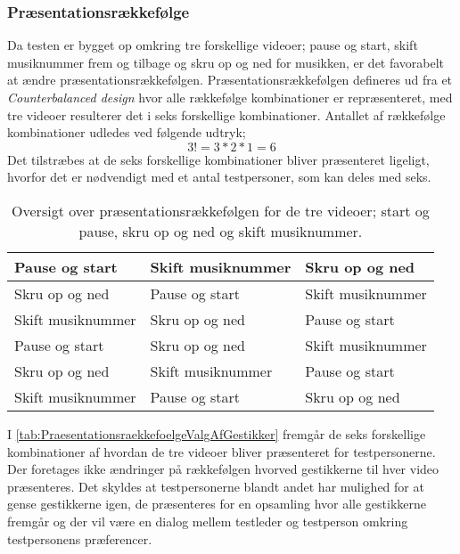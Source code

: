 \subsubsection{Præsentationsrækkefølge}
\label{PraesentationsraekkefoelgeValgAfGestikker}
%
Da testen er bygget op omkring tre forskellige videoer; pause og start, skift musiknummer frem og tilbage og skru op og ned for musikken, er det favorabelt at ændre præsentationsrækkefølgen. Præsentationsrækkefølgen defineres ud fra et \textit{Counterbalanced design} hvor alle rækkefølge kombinationer er repræsenteret, med tre videoer resulterer det i seks forskellige kombinationer. Antallet af rækkefølge kombinationer udledes ved følgende udtryk;
%
\begin{equation}
	3! = 3*2*1 = 6
\end{equation}
%
Det tilstræbes at de seks forskellige kombinationer bliver præsenteret ligeligt, hvorfor det er nødvendigt med et antal testpersoner, som kan deles med seks.
%
\begin{table}[H]
	\centering
	\begin{tabular}{ |  p{4cm}  |  p{4cm}  |  p{4cm}  |}
		\hline
		Pause og start & Skift musiknummer & Skru op og ned \\ \hline
		Skru op og ned & Pause og start & Skift musiknummer\\ \hline
		Skift musiknummer & Skru op og ned & Pause og start \\ \hline
		Pause og start & Skru op og ned & Skift musiknummer\\ \hline
		Skru op og ned & Skift musiknummer & Pause og start\\ \hline
		Skift musiknummer & Pause og start & Skru op og ned \\ \hline
	\end{tabular}
	\caption{Oversigt over præsentationsrækkefølgen for de tre videoer; start og pause, skru op og ned og skift musiknummer.}
	\label{tab:PraesentationsraekkefoelgeValgAfGestikker}
\end{table}
\noindent
%
I \autoref{tab:PraesentationsraekkefoelgeValgAfGestikker} fremgår de seks forskellige kombinationer af hvordan de tre videoer bliver præsenteret for testpersonerne. Der foretages ikke ændringer på rækkefølgen hvorved gestikkerne til hver video præsenteres. Det skyldes at testpersonerne blandt andet har mulighed for at gense gestikkerne igen, de præsenteres for en opsamling hvor alle gestikkerne fremgår og der vil være en dialog mellem testleder og testperson omkring testpersonens præferencer.  



